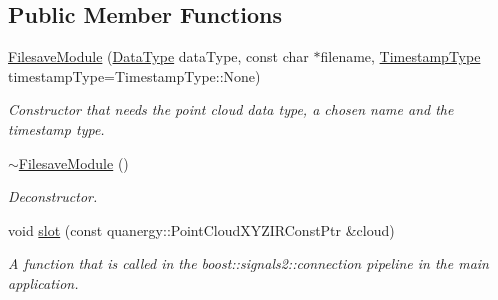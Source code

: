 \subsection*{Public Member Functions}
\begin{DoxyCompactItemize}
\item 
\hyperlink{classFilesaveModule_a10fd3e6d356c17b62def14c449fe9d05}{Filesave\-Module} (\hyperlink{classFilesaveModule_a268eda9476b90bc83b551c50eb7c67fe}{Data\-Type} data\-Type, const char $\ast$filename, \hyperlink{classFilesaveModule_a5c70900e45fc43e441b55ba02fd3ae21}{Timestamp\-Type} timestamp\-Type=Timestamp\-Type\-::\-None)
\begin{DoxyCompactList}\small\item\em Constructor that needs the point cloud data type, a chosen name and the timestamp type. \end{DoxyCompactList}\item 
\hypertarget{classFilesaveModule_aefc22e7e214dbd2d764fc1b49fa6b909}{\hyperlink{classFilesaveModule_aefc22e7e214dbd2d764fc1b49fa6b909}{$\sim$\-Filesave\-Module} ()}\label{classFilesaveModule_aefc22e7e214dbd2d764fc1b49fa6b909}

\begin{DoxyCompactList}\small\item\em Deconstructor. \end{DoxyCompactList}\item 
void \hyperlink{classFilesaveModule_ae01c6ca4cf3cbc17967c24330bc16dd5}{slot} (const quanergy\-::\-Point\-Cloud\-X\-Y\-Z\-I\-R\-Const\-Ptr \&cloud)
\begin{DoxyCompactList}\small\item\em A function that is called in the boost\-::signals2\-::connection pipeline in the main application. \end{DoxyCompactList}\end{DoxyCompactItemize}
